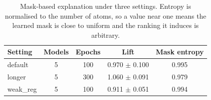\begin{table}[htbp]
\centering
\caption{Mask-based explanation under three settings. Entropy is normalised to the number of atoms, so a value near one means the learned mask is close to uniform and the ranking it induces is arbitrary.}
\label{tab:si_gnnexplainer}
\small
\setlength{\tabcolsep}{4pt}
\begin{tabular}{lcccc}
\toprule
Setting & Models & Epochs & Lift & Mask entropy \\
\midrule
default & 5 & 100 & 0.970 $\pm$ 0.100 & 0.995 \\
longer & 5 & 300 & 1.060 $\pm$ 0.091 & 0.979 \\
weak\_reg & 5 & 100 & 0.911 $\pm$ 0.051 & 0.994 \\
\bottomrule
\end{tabular}
\end{table}
